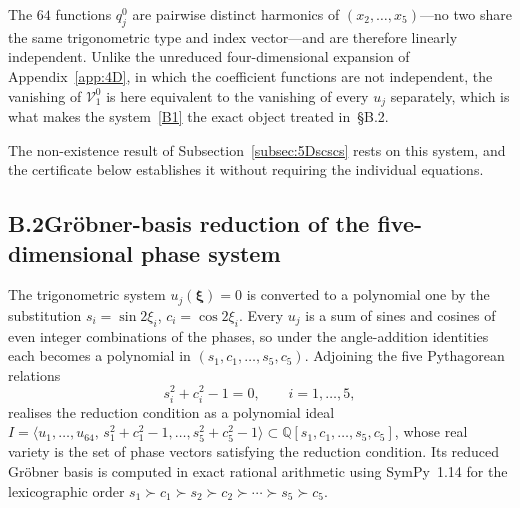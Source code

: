 \documentclass[11pt]{jfm}
\numberwithin{equation}{section}
\begin{document}
The $64$ functions $q_j^0$ are pairwise distinct harmonics of $(x_2,\dots,x_5)$---no two share the
same trigonometric type and index vector---and are therefore linearly independent. Unlike the
unreduced four-dimensional expansion of Appendix~\ref{app:4D}, in which the coefficient functions
are not independent, the vanishing of $\mathcal{V}_1^0$ is here equivalent to the vanishing of
every $u_j$ separately, which is what makes the system~\eqref{B1} the exact object treated
in~\S B.2.

The non-existence result of Subsection~\ref{subsec:5Dscscs} rests on this system, and the
certificate below establishes it without requiring the individual equations.

\subsection*{B.2\quad Gr\"obner-basis reduction of the five-dimensional phase system}
The trigonometric system $u_j(\boldsymbol{\xi})=0$ is converted to a polynomial one by the
substitution $s_i=\sin 2\xi_i$, $c_i=\cos 2\xi_i$. Every $u_j$ is a sum of sines and cosines of
even integer combinations of the phases, so under the angle-addition identities each becomes a
polynomial in $(s_1,c_1,\ldots,s_5,c_5)$. Adjoining the five Pythagorean relations
\begin{equation}
\label{B65}
s_i^2+c_i^2-1=0,\qquad i=1,\ldots,5,
\end{equation}
realises the reduction condition as a polynomial ideal
$I=\langle u_1,\ldots,u_{64},\,s_1^2+c_1^2-1,\ldots,s_5^2+c_5^2-1\rangle
\subset\mathbb{Q}[s_1,c_1,\ldots,s_5,c_5]$, whose real variety is the set of phase vectors
satisfying the reduction condition. Its reduced Gr\"obner basis is computed in exact rational arithmetic using SymPy~1.14 for the lexicographic order $s_1\succ c_1\succ s_2\succ c_2\succ\cdots\succ s_5\succ c_5$.
\end{document}
